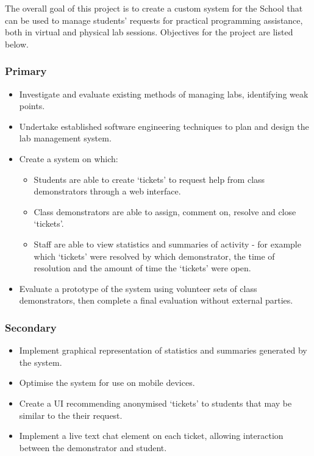 \documentclass[a4paper,11pt]{article}
\begin{document}
The overall goal of this project is to create a custom system for the School that can be used to manage students' requests for practical programming assistance, both in virtual and physical lab sessions. Objectives for the project are listed below.

\subsubsection*{Primary}
\begin{itemize}
    \item Investigate and evaluate existing methods of managing labs, identifying weak points.
    \item Undertake established software engineering techniques to plan and design the lab management system.
    \item Create a system on which:
    \begin{itemize}
        \item Students are able to create `tickets' to request help from class demonstrators through a web interface.
        \item Class demonstrators are able to assign, comment on, resolve and close `tickets'.
        \item Staff are able to view statistics and summaries of activity - for example which `tickets' were resolved by which demonstrator, the time of resolution and the amount of time the `tickets' were open.
    \end{itemize}
    \item Evaluate a prototype of the system using volunteer sets of class demonstrators, then complete a final evaluation without external parties. 
    
\end{itemize}

\subsubsection*{Secondary}
\begin{itemize}
    \item Implement graphical representation of statistics and summaries generated by the system.
    \item Optimise the system for use on mobile devices. 
    \item Create a UI recommending anonymised `tickets' to students that may be similar to the their request.
    \item Implement a live text chat element on each ticket, allowing interaction between the demonstrator and student.
\end{itemize}
\end{document}
